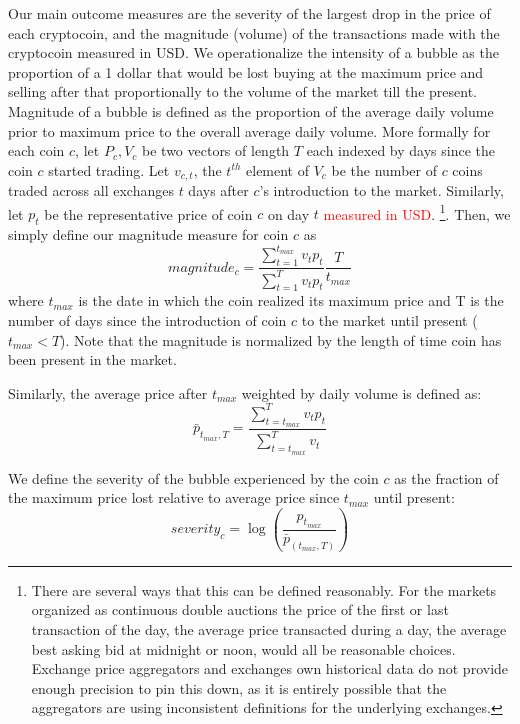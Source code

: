 Our main outcome measures are the severity of the largest drop in the price of each cryptocoin, and the magnitude (volume) of the transactions made with the cryptocoin measured in USD.
We operationalize the intensity of a bubble as the proportion of a 1 dollar that would be lost buying at the maximum price and selling after that proportionally to the volume of the market till the present. Magnitude of a bubble is defined as the proportion of the average daily volume prior to maximum price to the overall average daily volume.
More formally for each coin $c$, let $P_c,V_c$ be two vectors of length $T$ each indexed by days since the coin $c$ started trading.
Let $v_{c,t}$, the $t^{th}$ element of $V_c$ be the number of $c$ coins traded across all exchanges $t$ days after $c$'s introduction to the market. 
Similarly, let $p_t$ be the representative price of coin $c$ on day $t$ \textcolor{red}{measured in USD}.
\footnote{There are several ways that this can be defined reasonably. For the markets organized as continuous double auctions the price of the first or last transaction of the day,  the average price transacted during a day, the average best asking bid at midnight or noon, would all be reasonable choices. Exchange price aggregators and exchanges own historical data do not provide enough precision to pin this down, as it is entirely possible that the aggregators are using inconsistent definitions for the underlying exchanges.}. Then, we simply define our magnitude measure for coin $c$ as
\begin{equation}
magnitude_{c} = \frac{\sum_{t=1}^{t_{max}} v_t p_t} {\sum_{t=1}^{T} v_t  p_t} \frac{T}{t_{max}}
\end{equation}
where $t_{max}$ is the date in which the coin realized its maximum price and T is the number of days since the introduction of coin $c$ to the market until present ($t_{max} < T$). Note that the magnitude is normalized by the length of time coin has been present in the market.

Similarly, the average price after $t_{max}$ weighted by daily volume is defined as:
\begin{equation}
\bar{p}_{t_{max},T} = \frac{\sum_{t=t_{max}}^{T} v_t p_t} {\sum_{t=t_{max}}^{T} v_t}
\end{equation}

We define the severity of the bubble experienced by the coin $c$ as the fraction of the maximum price lost relative to average price since $t_{max}$ until present:
\begin{equation}
severity_{c} = \log(\frac{ p_{t_{max}}} {\bar{p}_{(t_{max},T)} })
\end{equation}

